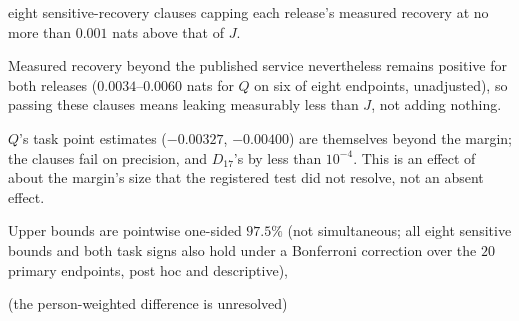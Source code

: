 
eight sensitive-recovery clauses capping each release's measured recovery at no more than $0.001$ nats
above that of $J$.

Measured recovery beyond the published service nevertheless remains positive for both releases
($0.0034$--$0.0060$ nats for $Q$ on six of eight endpoints, unadjusted), so passing these clauses means
leaking measurably less than $J$, not adding nothing.

$Q$'s task point estimates ($-0.00327$, $-0.00400$) are themselves beyond the margin; the clauses fail on
precision, and $D_{17}$'s by less than $10^{-4}$. This is an effect of about the margin's size that the
registered test did not resolve, not an absent effect.

Upper bounds are pointwise one-sided $97.5\%$ (not simultaneous; all eight sensitive bounds and both task
signs also hold under a Bonferroni correction over the $20$ primary endpoints, post hoc and descriptive),

(the person-weighted difference is unresolved)
